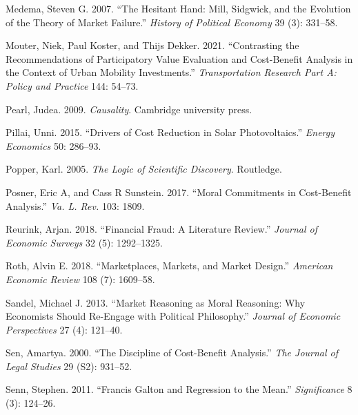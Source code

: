 \documentclass[
]{book}
\newlength{\cslhangindent}
\newlength{\cslentryspacingunit} %
\newenvironment{CSLReferences}[2] %
 {%
  \setlength{\parindent}{0pt}
  \ifodd #1
  \let\oldpar\par
  \def\par{\hangindent=\cslhangindent\oldpar}
  \fi
  \setlength{\parskip}{#2\cslentryspacingunit}
 }%
 {}
\begin{document}
\begin{CSLReferences}{1}{0}
\leavevmode{}%
Medema, Steven G. 2007. {``The Hesitant Hand: Mill, Sidgwick, and the Evolution of the Theory of Market Failure.''} \emph{History of Political Economy} 39 (3): 331--58.

\leavevmode{}%
Mouter, Niek, Paul Koster, and Thijs Dekker. 2021. {``Contrasting the Recommendations of Participatory Value Evaluation and Cost-Benefit Analysis in the Context of Urban Mobility Investments.''} \emph{Transportation Research Part A: Policy and Practice} 144: 54--73.

\leavevmode{}%
Pearl, Judea. 2009. \emph{Causality}. Cambridge university press.

\leavevmode{}%
Pillai, Unni. 2015. {``Drivers of Cost Reduction in Solar Photovoltaics.''} \emph{Energy Economics} 50: 286--93.

\leavevmode{}%
Popper, Karl. 2005. \emph{The Logic of Scientific Discovery}. Routledge.

\leavevmode{}%
Posner, Eric A, and Cass R Sunstein. 2017. {``Moral Commitments in Cost-Benefit Analysis.''} \emph{Va. L. Rev.} 103: 1809.

\leavevmode{}%
Reurink, Arjan. 2018. {``Financial Fraud: A Literature Review.''} \emph{Journal of Economic Surveys} 32 (5): 1292--1325.

\leavevmode{}%
Roth, Alvin E. 2018. {``Marketplaces, Markets, and Market Design.''} \emph{American Economic Review} 108 (7): 1609--58.

\leavevmode{}%
Sandel, Michael J. 2013. {``Market Reasoning as Moral Reasoning: Why Economists Should Re-Engage with Political Philosophy.''} \emph{Journal of Economic Perspectives} 27 (4): 121--40.

\leavevmode{}%
Sen, Amartya. 2000. {``The Discipline of Cost-Benefit Analysis.''} \emph{The Journal of Legal Studies} 29 (S2): 931--52.

\leavevmode{}%
Senn, Stephen. 2011. {``Francis Galton and Regression to the Mean.''} \emph{Significance} 8 (3): 124--26.


\end{CSLReferences}
\end{document}
